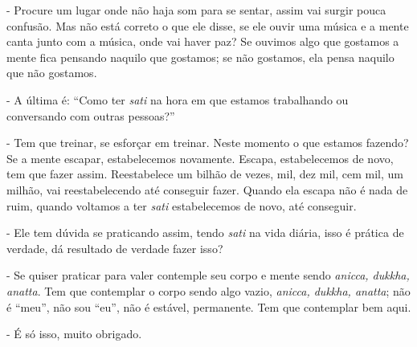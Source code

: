 - Procure um lugar onde não haja som para se sentar, assim vai
surgir pouca confusão. Mas não está correto o que ele disse, se ele
ouvir uma música e a mente canta junto com a música, onde vai haver
paz? Se ouvimos algo que gostamos a mente fica pensando naquilo que
gostamos; se não gostamos, ela pensa naquilo que não gostamos.

- A última é: “Como ter \textit{sati} na hora em que estamos
trabalhando ou conversando com outras pessoas?”

- Tem que treinar, se esforçar em treinar. Neste momento o que
estamos fazendo? Se a mente escapar, estabelecemos novamente. Escapa,
estabelecemos de novo, tem que fazer assim. Reestabelece um bilhão de
vezes, mil, dez mil, cem mil, um milhão, vai reestabelecendo até
conseguir fazer. Quando ela escapa não é nada de ruim, quando voltamos
a ter \textit{sati} estabelecemos de novo, até conseguir.

- Ele tem dúvida se praticando assim, tendo \textit{sati} na vida
diária, isso é prática de verdade, dá resultado de verdade fazer isso?

- Se quiser praticar para valer contemple seu corpo e mente sendo
\textit{anicca, dukkha, anatta}. Tem que contemplar o corpo sendo algo
vazio, \textit{anicca, dukkha, anatta}; não é “meu”, não sou “eu”, não
é estável, permanente. Tem que contemplar bem aqui.

- É só isso, muito obrigado.


